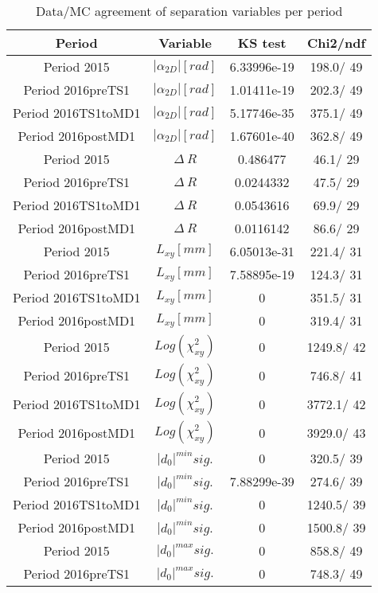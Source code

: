 \documentclass{article}
\begin{document}
\begin{longtable}{c|c|c|c}
\caption{\label{tab:sepVarsandSepPeriods}Data/MC agreement of separation variables per period}\\
Period & Variable & KS test & Chi2/ndf \\
\hline
 Period 2015 & $|\alpha_{2D}| [rad]$ & 6.33996e-19 & 198.0/ 49\\
\hline
 Period 2016preTS1 & $|\alpha_{2D}| [rad]$ & 1.01411e-19 & 202.3/ 49\\
\hline
 Period 2016TS1toMD1 & $|\alpha_{2D}| [rad]$ & 5.17746e-35 & 375.1/ 49\\
\hline
 Period 2016postMD1 & $|\alpha_{2D}| [rad]$ & 1.67601e-40 & 362.8/ 49\\
\hline
 Period 2015 & $\Delta~R$ & 0.486477 &  46.1/ 29\\
\hline
 Period 2016preTS1 & $\Delta~R$ & 0.0244332 &  47.5/ 29\\
\hline
 Period 2016TS1toMD1 & $\Delta~R$ & 0.0543616 &  69.9/ 29\\
\hline
 Period 2016postMD1 & $\Delta~R$ & 0.0116142 &  86.6/ 29\\
\hline
 Period 2015 & $L_{xy} [mm]$ & 6.05013e-31 & 221.4/ 31\\
\hline
 Period 2016preTS1 & $L_{xy} [mm]$ & 7.58895e-19 & 124.3/ 31\\
\hline
 Period 2016TS1toMD1 & $L_{xy} [mm]$ & 0 & 351.5/ 31\\
\hline
 Period 2016postMD1 & $L_{xy} [mm]$ & 0 & 319.4/ 31\\
\hline
 Period 2015 & $Log(\chi^{2}_{xy})$ & 0 & 1249.8/ 42\\
\hline
 Period 2016preTS1 & $Log(\chi^{2}_{xy})$ & 0 & 746.8/ 41\\
\hline
 Period 2016TS1toMD1 & $Log(\chi^{2}_{xy})$ & 0 & 3772.1/ 42\\
\hline
 Period 2016postMD1 & $Log(\chi^{2}_{xy})$ & 0 & 3929.0/ 43\\
\hline
 Period 2015 & $|d_{0}|^{min} sig.$ & 0 & 320.5/ 39\\
\hline
 Period 2016preTS1 & $|d_{0}|^{min} sig.$ & 7.88299e-39 & 274.6/ 39\\
\hline
 Period 2016TS1toMD1 & $|d_{0}|^{min} sig.$ & 0 & 1240.5/ 39\\
\hline
 Period 2016postMD1 & $|d_{0}|^{min} sig.$ & 0 & 1500.8/ 39\\
\hline
 Period 2015 & $|d_{0}|^{max} sig.$ & 0 & 858.8/ 49\\
\hline
 Period 2016preTS1 & $|d_{0}|^{max} sig.$ & 0 & 748.3/ 49\\

\end{longtable}
\end{document}
